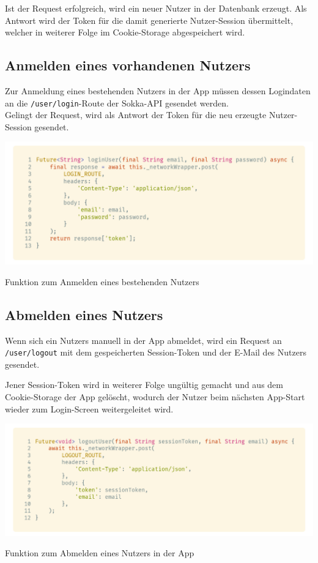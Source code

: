 \newpage

Ist der Request erfolgreich, wird ein neuer Nutzer in der Datenbank erzeugt. Als Antwort wird der
Token für die damit generierte Nutzer-Session übermittelt, welcher in weiterer Folge im Cookie-Storage
abgespeichert wird.

\subsection{Anmelden eines vorhandenen Nutzers}

Zur Anmeldung eines bestehenden Nutzers in der App müssen dessen Logindaten an die 
\lstinline{/user/login}-Route der Sokka-API gesendet werden.\\
Gelingt der Request, wird als Antwort der Token für die neu erzeugte Nutzer-Session gesendet.

\begin{code}
    \centering
    \includegraphics[width=1\textwidth]{images/Client/services/user-auth/login.png}
    \vspace{-25pt}
    \caption{Funktion zum Anmelden eines bestehenden Nutzers}
\end{code}

\subsection{Abmelden eines Nutzers}

Wenn sich ein Nutzers manuell in der App abmeldet, wird ein Request an \lstinline{/user/logout} mit
dem gespeicherten Session-Token und der E-Mail des Nutzers gesendet.

Jener Session-Token wird in weiterer Folge ungültig gemacht und aus dem Cookie-Storage der App
gelöscht, wodurch der Nutzer beim nächsten App-Start wieder zum Login-Screen weitergeleitet wird.

\begin{code}
    \centering
    \includegraphics[width=1\textwidth]{images/Client/services/user-auth/logout.png}
    \vspace{-25pt}
    \caption{Funktion zum Abmelden eines Nutzers in der App}
\end{code}


